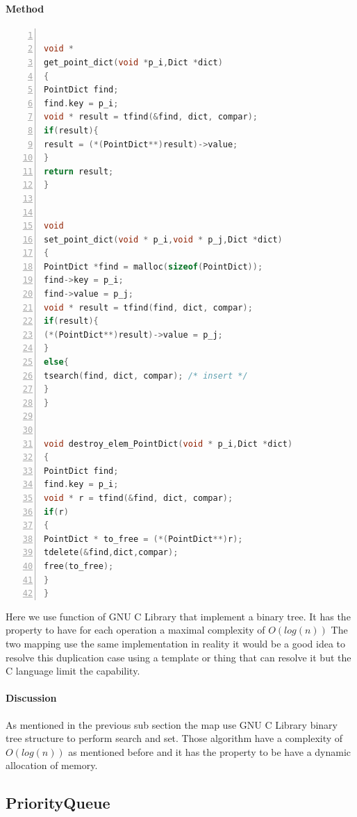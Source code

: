 \paragraph{Method}

\begin{lstlisting}[language=C, % Spécifie le langage du code
caption={Point Map Methods}, % Légende du listing
label=lst:pmap_c, % Étiquette pour référencer le listing
numbers=left,
numberstyle=\tiny\color{gray},
stepnumber=1,
frame=single,
breaklines=true,
postbreak=\mbox{\textcolor{red}{$\hookrightarrow$}\space},
showstringspaces=false
]

void *
get_point_dict(void *p_i,Dict *dict)
{
PointDict find;
find.key = p_i;
void * result = tfind(&find, dict, compar);
if(result){
result = (*(PointDict**)result)->value;
}
return result;
}


void
set_point_dict(void * p_i,void * p_j,Dict *dict)
{
PointDict *find = malloc(sizeof(PointDict));
find->key = p_i;
find->value = p_j;
void * result = tfind(find, dict, compar);
if(result){
(*(PointDict**)result)->value = p_j;
}
else{
tsearch(find, dict, compar); /* insert */
}
}


void destroy_elem_PointDict(void * p_i,Dict *dict)
{
PointDict find;
find.key = p_i;
void * r = tfind(&find, dict, compar);
if(r)
{
PointDict * to_free = (*(PointDict**)r);
tdelete(&find,dict,compar);
free(to_free);
}
}

\end{lstlisting}

\vspace{1cm}
Here we use function of GNU C Library that implement a binary tree. It has the property to have for each operation a maximal complexity of $O(log(n))$ The two mapping use the same implementation in reality it would be a good idea to resolve this duplication case using a template or thing that can resolve it but the C language limit the capability.

\paragraph{Discussion}
As mentioned in the previous sub section the map use GNU C Library binary tree structure to perform search and set. Those algorithm have a complexity of $O(log(n))$ as mentioned before and it has the property to be have a dynamic allocation of memory.

\subsection{PriorityQueue}

